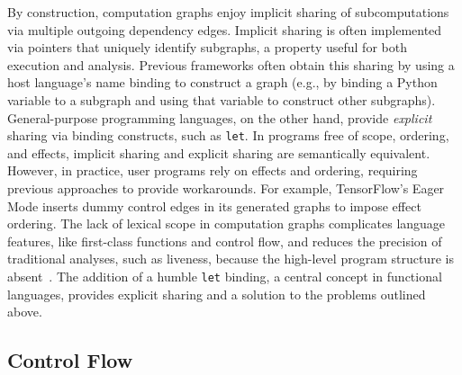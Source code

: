   By construction, computation graphs enjoy implicit sharing of subcomputations
    via multiple outgoing dependency edges.
  Implicit sharing is often implemented via pointers that uniquely identify subgraphs,
    a property useful for both execution and analysis.
  Previous frameworks often obtain this sharing by using a host
    language's name binding to construct a graph (e.g., by binding a Python variable
    to a subgraph and using that variable to construct other subgraphs).
  General-purpose programming languages, on the other hand, provide \textit{explicit}
    sharing via binding constructs, such as \verb|let|.
  In programs free of scope, ordering, and effects, implicit sharing
    and explicit sharing are semantically equivalent.
  However, in practice, user programs rely on effects and ordering,
    requiring previous approaches to provide workarounds.
  For example, TensorFlow's Eager Mode inserts dummy control edges
    in its generated graphs to impose effect ordering.
  The lack of lexical scope in computation graphs complicates language features,
    like first-class functions and control flow,
    and reduces the precision of traditional analyses,
    such as liveness,
    because the high-level program structure is absent~\citep{funarg, funarg_sol}.
  The addition of a humble \verb|let| binding, a central concept in functional languages,
    provides explicit sharing and a solution to the problems outlined above.

  \subsection*{Control Flow}

